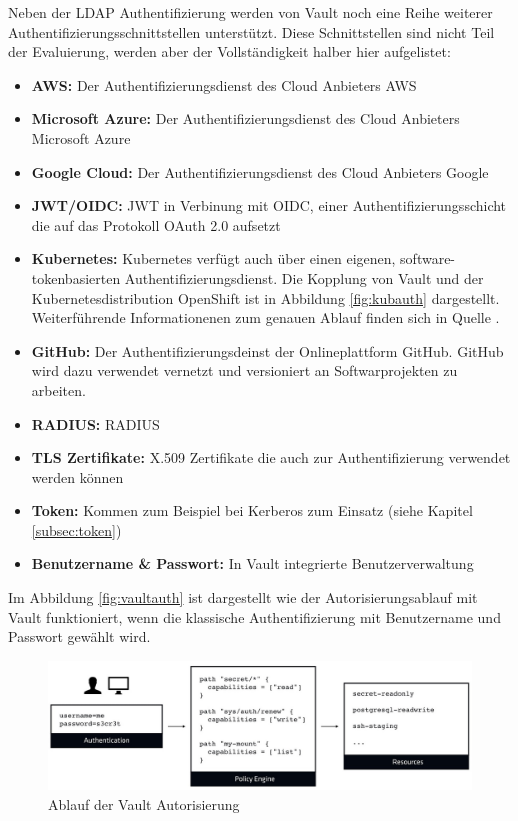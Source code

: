 \documentclass[
book,
a4paper,   
titlepage,  
halfparskip,
12pt        
]{scrartcl}
\begin{document}
\begin{onehalfspacing}
Neben der LDAP Authentifizierung werden von Vault noch eine Reihe weiterer Authentifizierungsschnittstellen unterstützt. Diese Schnittstellen sind nicht Teil der Evaluierung, werden aber der Vollständigkeit halber hier aufgelistet:\cite{vaultauth}
\begin{itemize}
	\item \textbf{\ac{AWS}:} Der Authentifizierungsdienst des Cloud Anbieters \ac{AWS}
	\item \textbf{Microsoft Azure:} Der Authentifizierungsdienst des Cloud Anbieters Microsoft Azure
	\item \textbf{Google Cloud:} Der Authentifizierungsdienst des Cloud Anbieters Google
	\item \textbf{\acs{JWT}/\acs{OIDC}:} \ac{JWT} in Verbinung mit \ac{OIDC}, einer Authentifizierungsschicht die auf das Protokoll OAuth 2.0 aufsetzt
	\item \textbf{Kubernetes:} Kubernetes verfügt auch über einen eigenen, software-tokenbasierten Authentifizierungsdienst. Die Kopplung von Vault und der Kubernetesdistribution OpenShift ist in Abbildung \vref{fig:kubauth} dargestellt. Weiterführende Informationenen zum genauen Ablauf finden sich in Quelle \cite{kubauth}.
	\item \textbf{GitHub:} Der Authentifizierungsdeinst der Onlineplattform GitHub. GitHub wird dazu verwendet vernetzt und versioniert an Softwarprojekten zu arbeiten.\cite{githubs}
	\item \textbf{\acs{RADIUS}:} \ac{RADIUS} 
	\item \textbf{\acs{TLS} Zertifikate:} X.509 Zertifikate die auch zur Authentifizierung verwendet werden können
	\item \textbf{Token:} Kommen zum Beispiel bei Kerberos zum Einsatz (siehe Kapitel \vref{subsec:token})
	\item \textbf{Benutzername \& Passwort:} In Vault integrierte Benutzerverwaltung
\end{itemize}

Im Abbildung \vref{fig:vaultauth} ist dargestellt wie der Autorisierungsablauf mit Vault funktioniert, wenn die klassische Authentifizierung mit Benutzername und Passwort gewählt wird.

\begin{figure}[h]
	\centering
	\includegraphics[width=1\linewidth]{vaultauth.jpg}
	\caption[Vault Autorisierung]{Ablauf der Vault Autorisierung \cite{vaultauth2}}
	\label{fig:vaultauth}
\end{figure}


\end{onehalfspacing}
\end{document}
